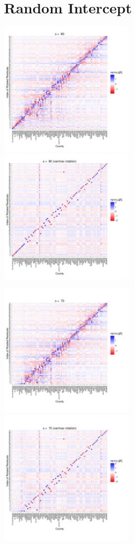 \documentclass{article} %
\begin{document}
\section*{Random Intercept}
\includegraphics[width=0.5\textwidth]{RandomIntercept_s80.pdf}
\includegraphics[width=0.5\textwidth]{RandomIntercept_s80_varimax.pdf}

\includegraphics[width=0.5\textwidth]{RandomIntercept_s70.pdf}
\includegraphics[width=0.5\textwidth]{RandomIntercept_s70_varimax.pdf}
\end{document}
